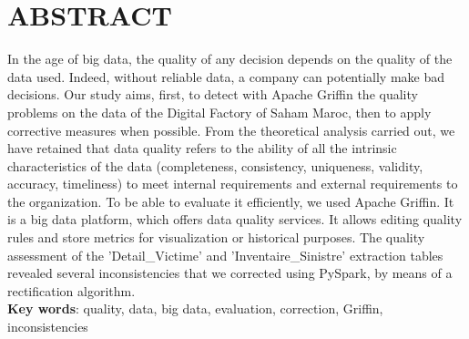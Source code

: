 \cleardoublepage
{}
{}
\section*{ABSTRACT}

In the age of big data, the quality of any decision depends on the quality of the data used. Indeed, without reliable data, a company can potentially make bad decisions. Our study aims, first, to detect with Apache Griffin the quality problems on the data of the Digital Factory of Saham Maroc, then to apply corrective measures when possible. From the theoretical analysis carried out, we have retained that data quality refers to the ability of all the intrinsic characteristics of the data (completeness, consistency, uniqueness, validity, accuracy, timeliness) to meet internal requirements and external requirements to the organization. To be able to evaluate it efficiently, we used Apache Griffin. It is a big data platform, which offers data quality services. It allows editing quality rules and store metrics for visualization or historical purposes. The quality assessment of the 'Detail\_Victime' and 'Inventaire\_Sinistre' extraction tables revealed several inconsistencies that we corrected using PySpark, by means of a rectification algorithm.\\
\textbf{Key words}: quality, data, big data, evaluation, correction, Griffin, inconsistencies